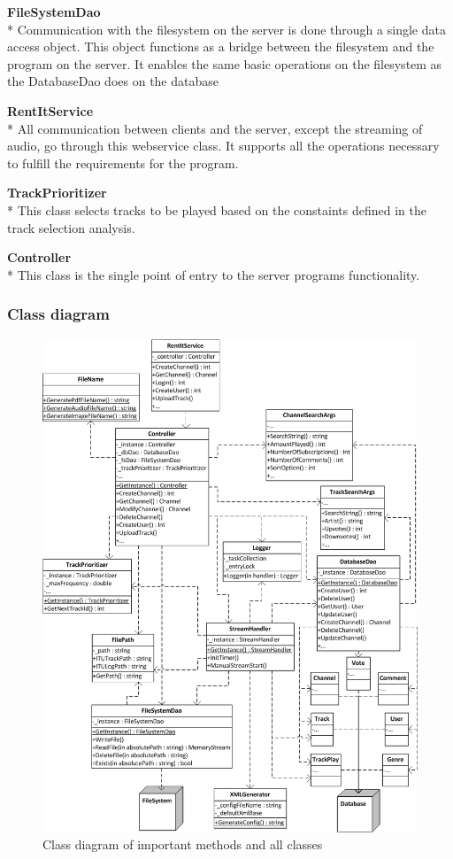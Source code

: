 \documentclass[a4paper,11pt,report]{article}
\begin{document}
\textbf{FileSystemDao} \\*
Communication with the filesystem on the server is done through a single data access object. This object functions as a bridge between the filesystem and the program on the server. It enables the same basic operations on the filesystem as the DatabaseDao does on the database

\textbf{RentItService} \\*
All communication between clients and the server, except the streaming of audio, go through this webservice class. It supports all the operations necessary to fulfill the requirements for the program. 

\textbf{TrackPrioritizer} \\*
This class selects tracks to be played based on the constaints defined in the track selection analysis.

\textbf{Controller} \\*
This class is the single point of entry to the server programs functionality.

\newpage
\subsubsection{Class diagram}
\begin{figure}[H]
  \centering
\includegraphics[width=450pt,keepaspectratio=true]{./ClassDiagramv2.png}
\caption{Class diagram of important methods and all classes}
\end{figure}
\end{document}
